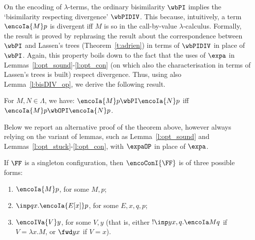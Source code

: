 On
 the encoding of $\lambda$-terms, 
the ordinary
bisimilarity $\wbPI$ implies the `bisimilarity respecting divergence' $\wbPIDIV$. 
%
%
This
because, intuitively, a term  $\encoIa {M} p$ is divergent iff $M$ is so in the call-by-value
$\lambda$-calculus.    Formally, the result is proved by rephrasing the result about the 
correspondence between $\wbPI$ and Lassen's trees (Theorem~\ref{t:adrien}) in terms of 
$\wbPIDIV$ in place of $\wbPI$. Again, this property boils down to the fact that the uses of
$\expa$ in Lemmas~\ref{l:opt_sound}-\ref{l:opt_con} (on which also the characterisation in
terms of Lassen's trees is built) respect divergence.  
Thus, using also Lemma~\ref{l:bisDIV_op}, we derive the following result. 

\begin{theorem}
\label{t:wbPI-wbOPI}
For $M,N \in \Lambda $, we have:
$\encoIa {M} p \wbPI \encoIa {N} p$ iff 
$\encoIa {M} p \wbOPI \encoIa {N} p$. 
\end{theorem} 








\noindent
Below we report an alternative proof of the theorem above, however
always relying  on the variant of lemmas, such as  
 Lemma~\ref{l:opt_sound} and Lemmas~\ref{l:opt_stuck}-\ref{l:opt_con}, with 
$\expaOP $ in place of $\expa$. 

\begin{lemma}
\label{l:shapesT}
If $\FF$ is a singleton configuration, then  $\encoConI{\FF}$ is of three possible forms: 
\begin{enumerate}
\item 
$\encoIa {M} p$, for some $M,p$;
\item
$\inp qx .\encoIa {E[x]} p $, for some $E,x,q,p$;
\item 
$\encoIVa {V} y$, for some $V,y$ (that is, either  $!\inp y {x,q}.\encoIa M q$ if $V  =
\lambda x. M$, or $ \fwd y x$ if $V = x$).
\end{enumerate}  
\end{lemma} 


